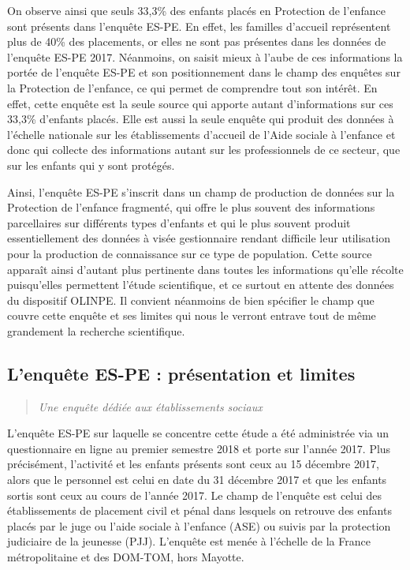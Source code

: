 \documentclass[
  12,
  a4paper,
]{report}
\begin{document}
On observe ainsi que seuls 33,3\% des enfants placés en Protection de
l'enfance sont présents dans l'enquête ES-PE. En effet, les familles
d'accueil représentent plus de 40\% des placements, or elles ne sont pas
présentes dans les données de l'enquête ES-PE 2017. Néanmoins, on saisit
mieux à l'aube de ces informations la portée de l'enquête ES-PE et son
positionnement dans le champ des enquêtes sur la Protection de
l'enfance, ce qui permet de comprendre tout son intérêt. En effet, cette
enquête est la seule source qui apporte autant d'informations sur ces
33,3\% d'enfants placés. Elle est aussi la seule enquête qui produit des
données à l'échelle nationale sur les établissements d'accueil de l'Aide
sociale à l'enfance et donc qui collecte des informations autant sur les
professionnels de ce secteur, que sur les enfants qui y sont protégés.

Ainsi, l'enquête ES-PE s'inscrit dans un champ de production de données
sur la Protection de l'enfance fragmenté, qui offre le plus souvent des
informations parcellaires sur différents types d'enfants et qui le plus
souvent produit essentiellement des données à visée gestionnaire rendant
difficile leur utilisation pour la production de connaissance sur ce
type de population. Cette source apparaît ainsi d'autant plus pertinente
dans toutes les informations qu'elle récolte puisqu'elles permettent
l'étude scientifique, et ce surtout en attente des données du dispositif
OLINPE. Il convient néanmoins de bien spécifier le champ que couvre
cette enquête et ses limites qui nous le verront entrave tout de même
grandement la recherche scientifique.

\hypertarget{lenquuxeate-es-pe-pruxe9sentation-et-limites}{%
\subsection{L'enquête ES-PE : présentation et
limites}\label{lenquuxeate-es-pe-pruxe9sentation-et-limites}}

\begin{quote}
\emph{Une enquête dédiée aux établissements sociaux}
\end{quote}

L'enquête ES-PE sur laquelle se concentre cette étude a été administrée
via un questionnaire en ligne au premier semestre 2018 et porte sur
l'année 2017. Plus précisément, l'activité et les enfants présents sont
ceux au 15 décembre 2017, alors que le personnel est celui en date du 31
décembre 2017 et que les enfants sortis sont ceux au cours de l'année
2017. Le champ de l'enquête est celui des établissements de placement
civil et pénal dans lesquels on retrouve des enfants placés par le juge
ou l'aide sociale à l'enfance (ASE) ou suivis par la protection
judiciaire de la jeunesse (PJJ). L'enquête est menée à l'échelle de la
France métropolitaine et des DOM-TOM, hors Mayotte.
\end{document}
